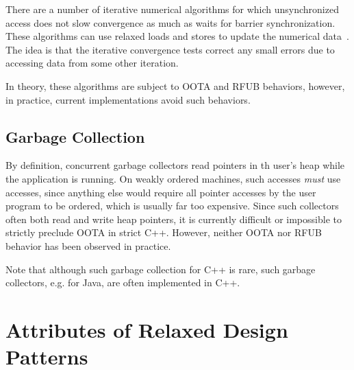 \documentclass[10]{article}
\begin{document}
There are a number of iterative numerical algorithms for which unsynchronized
access does not slow convergence as much as waits for barrier synchronization.
These algorithms can use relaxed loads and stores to update the numerical
data~\cite{Andrews91textbook}.
The idea is that the iterative convergence tests correct any small errors
due to accessing data from some other iteration.

In theory, these algorithms are subject to OOTA and RFUB behaviors, however,
in practice, current implementations avoid such behaviors.

\subsection{Garbage Collection}
\label{sec:Garbage Collection}

By definition, concurrent garbage collectors read pointers in th
user's heap while the application is running.
On weakly ordered machines, such accesses {\it must} use
 accesses, since anything else would require
all pointer accesses by the user program to be ordered, which is usually
far too expensive.
Since such collectors often both read and write heap pointers, it is
currently difficult or impossible to strictly preclude OOTA in strict C++.
However, neither OOTA nor RFUB behavior has been observed in practice.

Note that although such garbage collection for C++ is rare, such garbage
collectors, e.g. for Java, are often implemented in C++.


\section{Attributes of Relaxed Design Patterns}
\label{sec:Attributes of Relaxed Design Patterns}
\end{document}
